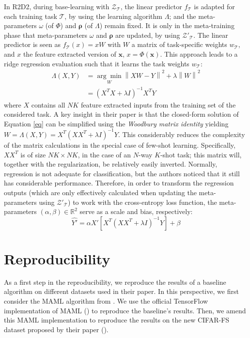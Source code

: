 In R2D2, during base-learning with $\mathcal{Z}_\mathcal{T}$, the linear predictor $f_\mathcal{T}$ is adapted for each training task $\mathcal{T}$, by using the learning algorithm $\Lambda$; and the meta-parameters $\omega$ (of $\Phi$) and $\bm{\rho}$ (of $\Lambda$) remain fixed. It is only in the meta-training phase that meta-parameters $\omega$ and $\bm{\rho}$ are updated, by using $\mathcal{Z}'_\mathcal{T}$. The linear predictor is seen as $f_\mathcal{T}(x)=xW$ with $W$ a matrix of task-specific weights $w_\mathcal{T}$, and $x$ the feature extracted version of $\bm{x}$, $x = \Phi(\bm{x})$. This approach leads to a ridge regression evaluation such that it learns the task weights  $w_\mathcal{T}$:
\newcommand{\norm}[1]{\left\lVert#1\right\rVert}
\begin{align}
\Lambda(X,Y) &= \underset{W}{\arg\min} \norm{XW-Y}^2 + \lambda\norm{W}^2 \\
&= (X^TX+\lambda I)^{-1}X^TY \label{eq}
\end{align}
where $X$ contains all $NK$ feature extracted inputs from the training set of the considered task. A key insight in their paper is that the closed-form solution of Equation \ref{eq} can be simplified using the \textit{Woodbury matrix identity} yielding $W = \Lambda(X,Y) = X^T(XX^T+\lambda I)^{-1}Y$. This considerably reduces the complexity of the matrix calculations in the special case of few-shot learning. Specifically, $XX^T$ is of size $NK\times NK$, in the case of an $N$-way $K$-shot task; this matrix will, together with the regularization, be relatively easily inverted. Normally, regression is not adequate for classification, but the authors noticed that it still has considerable performance. Therefore, in order to transform the regression outputs (which are only effectively calculated when updating the meta-parameters using $\mathcal{Z}'_\mathcal{T}$)  to work with the cross-entropy loss function, the meta-parameters $(\alpha, \beta) \in \mathbb{R}^2$ serve as a scale and bias, respectively:
\begin{equation}
\hat{Y'} = \alpha X'\left[ X^T(XX^T+\lambda I)^{-1} Y\right] + \beta
\label{wood}
\end{equation}

\section{Reproducibility}
\label{repro}
As a first step in the reproducibility, we reproduce the results of a baseline algorithm on different datasets used in their paper. In this perspective, we first consider the MAML algorithm from \citet{finn}. We use the official TensorFlow implementation of MAML (\citet{MAML}) to reproduce the baseline's results. Then, we amend this MAML implementation to reproduce the results on the new \textsc{CIFAR-FS} dataset proposed by their paper (\citet{R2D2}).


